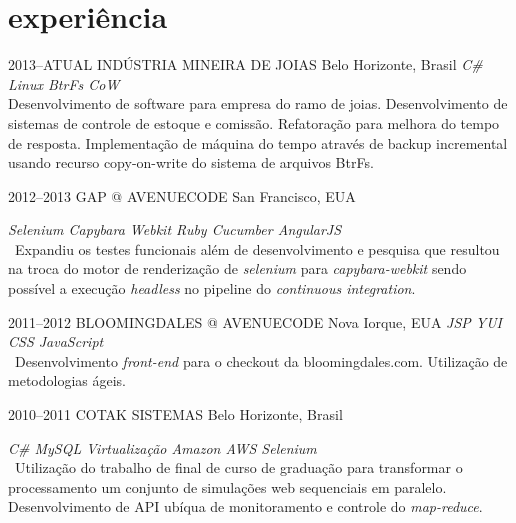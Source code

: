 \documentclass[]{friggeri-cv}
\begin{document}
\section{experiência}

\begin{entrylist}


\entry
{2013--ATUAL}
{INDÚSTRIA MINEIRA DE JOIAS}
{Belo Horizonte, Brasil}
{\emph{\bullet C\# \bullet Linux \bullet BtrFs CoW  } \\ Desenvolvimento de software para empresa do ramo de joias. Desenvolvimento de sistemas de controle de estoque e comissão. Refatoração para melhora do tempo de resposta. Implementação de máquina do tempo através de backup incremental usando recurso copy-on-write do sistema de arquivos BtrFs. }


\entry
{2012--2013}
{GAP @ AVENUECODE}
{San Francisco, EUA}
{\emph{\bullet Selenium \bullet Capybara \bullet Webkit \bullet Ruby \bullet Cucumber \bullet AngularJS } \\
\
Expandiu os testes funcionais além de desenvolvimento e pesquisa que resultou na troca do motor de renderização de \textit{selenium} para \textit{capybara-webkit} sendo possível a execução \textit{headless} no pipeline do \textit{continuous integration}.%

}


\entry
{2011--2012}
{BLOOMINGDALES @ AVENUECODE}
{Nova Iorque, EUA}
{\emph{\bullet JSP \bullet YUI \bullet CSS \bullet JavaScript } \\
\
Desenvolvimento \textit{front-end} para o checkout da bloomingdales.com. Utilização de metodologias ágeis.
}

\entry
{2010--2011}
{COTAK SISTEMAS}
{Belo Horizonte, Brasil}
{\emph{\bullet C\# \bullet MySQL \bullet Virtualização \bullet Amazon AWS \bullet Selenium } \\
\
Utilização do trabalho de final de curso de graduação para transformar o processamento um conjunto de simulações web sequenciais em paralelo. Desenvolvimento de API ubíqua de monitoramento e controle do \textit{map-reduce}.

}
\end{entrylist}
\end{document}

